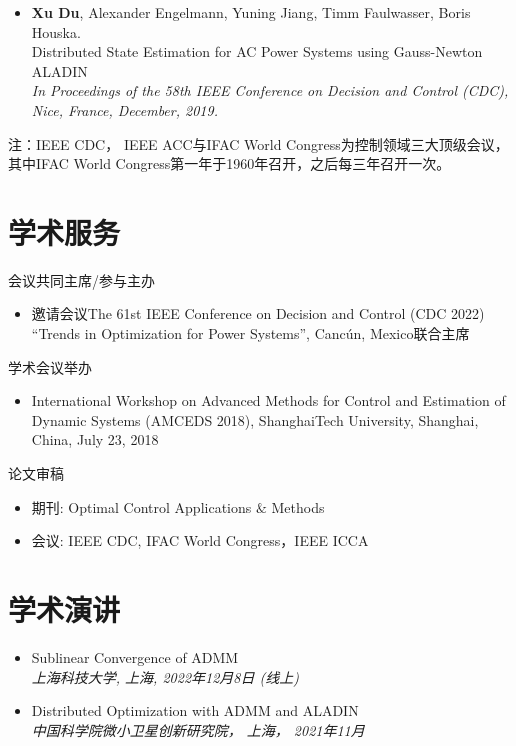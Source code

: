 \documentclass[paper=a4,fontsize=11pt]{scrartcl} %
\newcommand{\NewPart}[1]{\section*{\uppercase{#1}}}
\newcommand{\EducationEntry}[4]{
		\noindent \textbf{#1} \hfill      %
		\colorbox{White}{%
			\parbox{5cm}{%
			\hfill\color{Black}#2}} \par  %
		\noindent \textit{#3} \par        %
		\noindent\hangindent=2em\hangafter=0 \small #4 %
		\normalsize \par}
\begin{document}
\begin{CJK*}{UTF8}{gbsn}
\begin{itemize}
	\item  {\textbf{Xu Du}, Alexander Engelmann, Yuning Jiang, Timm Faulwasser, Boris Houska. \\
		Distributed State Estimation for AC Power Systems using Gauss-Newton ALADIN \\
		 \emph{In Proceedings of the 58th IEEE Conference on Decision and Control (CDC),
		Nice, France, December, 2019.} }
\end{itemize}
注：IEEE CDC， IEEE ACC与IFAC World Congress为控制领域三大顶级会议，其中IFAC World Congress第一年于1960年召开，之后每三年召开一次。
\NewPart{学术服务}{会议共同主席/参与主办}
%
\begin{itemize}
	\item{邀请会议The 61st
		IEEE Conference on Decision and Control (CDC 2022)
		“Trends in Optimization for Power Systems”, Canc\'un, Mexico联合主席}
	\end{itemize}
{学术会议举办}
\begin{itemize}
\item{International Workshop on Advanced Methods for Control and Estimation of Dynamic
	Systems (AMCEDS 2018), ShanghaiTech University, Shanghai, China, July 23, 2018}
\end{itemize}
{论文审稿}
\begin{itemize}
	\item 期刊: Optimal Control Applications $\&$ Methods
	\item 会议: IEEE CDC, IFAC World Congress，IEEE ICCA
\end{itemize}

\NewPart{学术演讲}{}
\begin{itemize}
	
	\item {
		{Sublinear Convergence of ADMM}\\
		\emph{上海科技大学, 上海, 2022年12月8日 (线上)	} }
	\item  {
		{Distributed Optimization with ADMM and ALADIN}\\
		\emph{中国科学院微小卫星创新研究院， 上海， 2021年11月
	} }
	

\end{itemize}
\end{CJK*}
\end{document}
